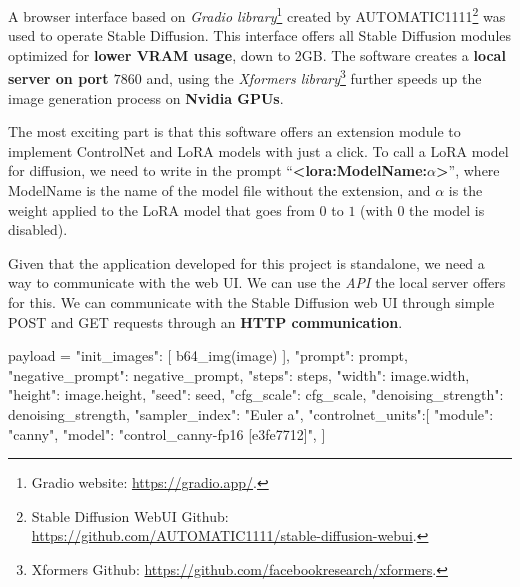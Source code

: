 \documentclass[preprint]{elsarticle}
\begin{document}
A browser interface based on \emph{Gradio library}\footnote{Gradio website: \url{https://gradio.app/}.} 
created by AUTOMATIC1111\footnote{Stable Diffusion WebUI Github: \url{https://github.com/AUTOMATIC1111/stable-diffusion-webui}.} 
was used to operate Stable Diffusion. 
This interface offers all Stable Diffusion modules optimized for \textbf{lower VRAM usage}, down to 2GB. 
The software creates a \textbf{local server on port $7860$} and,  using the \emph{Xformers library}\footnote{Xformers Github: \url{https://github.com/facebookresearch/xformers}.} further speeds up the image generation process on \textbf{Nvidia GPUs}.

The most exciting part is that this software offers an extension module to  implement ControlNet and LoRA models with just a click.  To call a LoRA model for diffusion, we need to write in the prompt ``\textbf{<lora:ModelName:$\alpha$>}'',  where ModelName is the name of the model file without the extension,  and $\alpha$ is the weight applied to the LoRA model that goes from $0$ to $1$ (with $0$ the model is disabled). 

Given that the application developed for this project is standalone,  we need a way to communicate with the web UI. We can use the \emph{API} the local server offers for this.
We can communicate with the Stable Diffusion web UI through simple 
POST and GET requests through an \textbf{HTTP communication}. 

\begin{python}
	payload = {
		"init_images": [
		b64_img(image)
		],
		"prompt": prompt,
		"negative_prompt": negative_prompt,
		"steps": steps,
		"width": image.width,
		"height": image.height,
		"seed": seed,
		"cfg_scale": cfg_scale,
		"denoising_strength": denoising_strength,
		"sampler_index": "Euler a",
		"controlnet_units":[
		{
			"module": "canny",
			"model": "control_canny-fp16 [e3fe7712]",
		}
		]
	}
\end{python}
\end{document}
